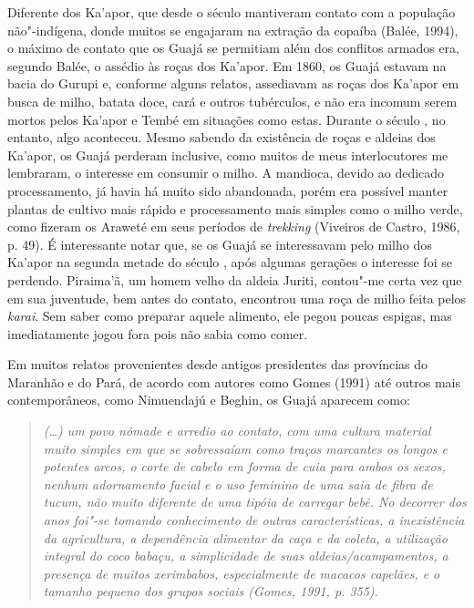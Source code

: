 Diferente dos Ka'apor, que desde o século  mantiveram contato com a
população não"-indígena, donde muitos se engajaram na extração da copaíba
(Balée, 1994), o máximo de contato que os Guajá se permitiam além dos
conflitos armados era, segundo Balée, o assédio às roças dos Ka'apor. Em
1860, os Guajá estavam na bacia do Gurupi e, conforme alguns relatos,
assediavam as roças dos Ka'apor em busca de milho, batata doce, cará e
outros tubérculos, e não era incomum serem mortos pelos Ka'apor e Tembé
em situações como estas. Durante o século , no entanto, algo
aconteceu. Mesmo sabendo da existência de roças e aldeias dos Ka'apor,
os Guajá perderam inclusive, como muitos de meus interlocutores me
lembraram, o interesse em consumir o milho. A mandioca, devido ao
dedicado processamento, já havia há muito sido abandonada, porém era
possível manter plantas de cultivo mais rápido e processamento mais
simples como o milho verde, como fizeram os Araweté em seus períodos de
\emph{trekking} (Viveiros de Castro, 1986, p. 49). É interessante notar
que, se os Guajá se interessavam pelo milho dos Ka'apor na segunda
metade do século , após algumas gerações o interesse foi se perdendo.
Piraima'ã, um homem velho da aldeia Juriti, contou"-me certa vez que em
sua juventude, bem antes do contato, encontrou uma roça de milho feita
pelos \emph{karai}. Sem saber como preparar aquele alimento, ele pegou
poucas espigas, mas imediatamente jogou fora pois não sabia como comer.

Em muitos relatos provenientes desde antigos presidentes das províncias
do Maranhão e do Pará, de acordo com autores como Gomes (1991) até
outros mais contemporâneos, como Nimuendajú e Beghin, os Guajá aparecem
como:

\begin{quote}
\emph{(\ldots) um povo nômade e arredio ao contato, com uma cultura material
muito simples em que se sobressaíam como traços marcantes os longos e
potentes arcos, o corte de cabelo em forma de cuia para ambos os sexos,
nenhum adornamento facial e o uso feminino de uma saia de fibra de
tucum, não muito diferente de uma tipóia de carregar bebê. No decorrer
dos anos foi"-se tomando conhecimento de outras características, a
inexistência da agricultura, a dependência alimentar da caça e da
coleta, a utilização integral do coco babaçu, a simplicidade de suas
aldeias/acampamentos, a presença de muitos xerimbabos, especialmente de
macacos capelães, e o tamanho pequeno dos grupos sociais (Gomes, 1991,
p. 355).}
\end{quote}

